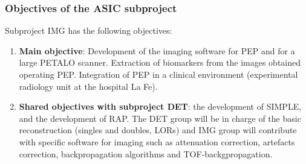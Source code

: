 \subsubsection*{Objectives of the ASIC subproject}
Subproject IMG has the following objectives:
\begin{enumerate}
\item {\bf Main objective}: Development of the imaging software for PEP and for a large PETALO scanner. Extraction of biomarkers from the images obtained operating PEP. Integration of PEP in a clinical environment (experimental radiology unit at the hospital La Fe). 
\item {\bf Shared objectives with subproject DET}: the development of SIMPLE, and the development of RAP. The DET group will be in charge of the basic reconstruction (singles and doubles, LORs) and IMG group will contribute with specific software for imaging such as attenuation correction, artefacts correction, backpropagation algorithms and TOF-backgpropagation.
\end{enumerate}
